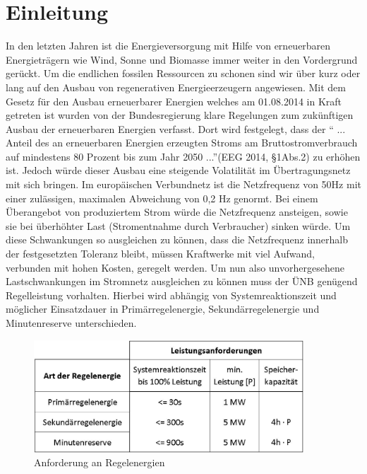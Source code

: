 
\chapter*{Einleitung}\thispagestyle{fancy}




In den letzten Jahren ist die Energieversorgung mit Hilfe von erneuerbaren Energieträgern wie Wind, Sonne und Biomasse immer weiter in den Vordergrund gerückt. Um die endlichen fossilen Ressourcen zu  schonen sind wir über kurz oder lang auf den Ausbau von regenerativen Energieerzeugern angewiesen. Mit dem Gesetz für den Ausbau erneuerbarer Energien welches am 01.08.2014 in Kraft getreten ist wurden von der Bundesregierung klare Regelungen zum zukünftigen Ausbau der erneuerbaren Energien verfasst. Dort wird festgelegt, dass der 
"` ... Anteil des an erneuerbaren Energien erzeugten Stroms am Bruttostromverbrauch auf mindestens 80 Prozent bis zum Jahr 2050 ..."'(\cite{Bundestag.21.07.2014}EEG 2014, §1Abs.2) zu erhöhen ist. Jedoch würde dieser Ausbau eine steigende Volatilität im Übertragungsnetz mit sich bringen. Im europäischen Verbundnetz ist die Netzfrequenz von 50Hz mit einer zulässigen, maximalen Abweichung von 0,2 Hz genormt. Bei einem Überangebot von produziertem Strom würde die Netzfrequenz ansteigen, sowie sie bei überhöhter Last (Stromentnahme durch Verbraucher) sinken würde. Um diese Schwankungen so ausgleichen zu können, dass die Netzfrequenz innerhalb der festgesetzten Toleranz bleibt, müssen Kraftwerke mit viel Aufwand, verbunden mit hohen Kosten, geregelt werden. Um nun also unvorhergesehene Lastschwankungen im Stromnetz ausgleichen zu können muss der ÜNB genügend Regelleistung vorhalten. Hierbei wird abhängig von Systemreaktionszeit und  möglicher Einsatzdauer in Primärregelenergie, Sekundärregelenergie und Minutenreserve unterschieden. 
\begin{figure}[h]
	\centering
		\includegraphics[width=0.90\textwidth]{images/Tabelle_Regelenergien.JPG}
	\caption{Anforderung an Regelenergien}
	\label{fig:Tabelle Regelenergien}
\end{figure}

